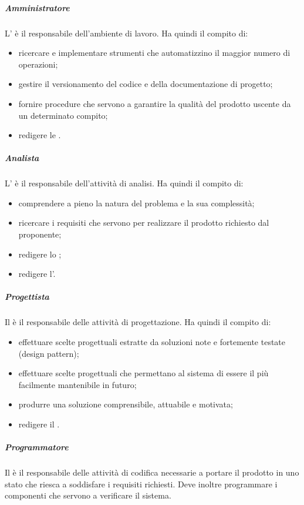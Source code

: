 				\subparagraph{Amministratore}
				L'\roleAdministrator{} è il responsabile dell'ambiente di lavoro. \newline
				Ha quindi il compito di:
					\begin{itemize}
						\item ricercare e implementare strumenti che automatizzino il maggior numero di operazioni;
						\item gestire il versionamento del codice e della documentazione di progetto;
						\item fornire procedure che servono a garantire la qualità del prodotto uscente da un determinato compito;
						\item redigere le \docNameVersionNdP.
					\end{itemize}
				\subparagraph{Analista}
				L'\roleAnalyst{} è il responsabile dell'attività di analisi.\newline
				Ha quindi il compito di:
					\begin{itemize}
						\item comprendere a pieno la natura del problema e la sua complessità;
						\item ricercare i requisiti che servono per realizzare il prodotto richiesto dal proponente;
						\item redigere lo \docNameVersionSdF;
						\item redigere l'\docNameVersionAdR.
					\end{itemize}
				\subparagraph{Progettista}
				Il \roleDesigner{} è il responsabile delle attività di progettazione. \newline
				Ha quindi il compito di:
					\begin{itemize}
						\item effettuare scelte progettuali estratte da soluzioni note e fortemente testate (design pattern);
						\item effettuare scelte progettuali che permettano al sistema di essere il più facilmente mantenibile in futuro;
						\item produrre una soluzione comprensibile, attuabile e motivata;
						\item redigere il \docNameVersionPdQ.
					\end{itemize}
				\subparagraph{Programmatore}
				Il \roleProgrammer{} è il responsabile delle attività di codifica necessarie a portare il prodotto in uno stato che riesca a soddisfare i requisiti richiesti. Deve inoltre programmare i componenti che servono a verificare il sistema. \newline
